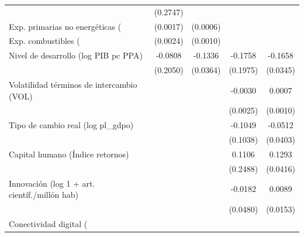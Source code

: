 \begin{table}[htbp]
\begin{tabular}{l*{4}{c}}
                    &    (0.2747)         &                     &                     &                     \\
\addlinespace
Exp. primarias no energéticas (%
                    &    (0.0017)         &    (0.0006)         &                     &                     \\
\addlinespace
Exp. combustibles (%
                    &    (0.0024)         &    (0.0010)         &                     &                     \\
\addlinespace
Nivel de desarrollo (log PIB pc PPA)&     -0.0808         &     -0.1336\sym{***}&     -0.1758         &     -0.1658\sym{***}\\
                    &    (0.2050)         &    (0.0364)         &    (0.1975)         &    (0.0345)         \\
\addlinespace
Volatilidad términos de intercambio (VOL)&                     &                     &     -0.0030         &      0.0007         \\
                    &                     &                     &    (0.0025)         &    (0.0010)         \\
\addlinespace
Tipo de cambio real (log pl\_gdpo)&                     &                     &     -0.1049         &     -0.0512         \\
                    &                     &                     &    (0.1038)         &    (0.0403)         \\
\addlinespace
Capital humano (Índice retornos)&                     &                     &      0.1106         &      0.1293\sym{***}\\
                    &                     &                     &    (0.2488)         &    (0.0416)         \\
\addlinespace
Innovación (log 1 + art. científ./millón hab)&                     &                     &     -0.0182         &      0.0089         \\
                    &                     &                     &    (0.0480)         &    (0.0153)         \\
\addlinespace
Conectividad digital (%

\end{tabular}
\end{table}
